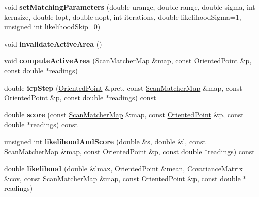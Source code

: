 \begin{DoxyCompactItemize}
void {\bfseries set\+Matching\+Parameters} (double urange, double range, double sigma, int kernsize, double lopt, double aopt, int iterations, double likelihood\+Sigma=1, unsigned int likelihood\+Skip=0)
\item 
\mbox{\label{classGMapping_1_1ScanMatcher_a60ef33bbb1408a534a74efccd096fc16}} 
void {\bfseries invalidate\+Active\+Area} ()
\item 
\mbox{\label{classGMapping_1_1ScanMatcher_a6cf280963c3d391f2cc8677f8e2e11cd}} 
void {\bfseries compute\+Active\+Area} (\hyperlink{classGMapping_1_1Map}{Scan\+Matcher\+Map} \&map, const \hyperlink{structGMapping_1_1orientedpoint}{Oriented\+Point} \&p, const double $\ast$readings)
\item 
\mbox{\label{classGMapping_1_1ScanMatcher_a676430fc7673dc7d9786a4a39e16f67d}} 
double {\bfseries icp\+Step} (\hyperlink{structGMapping_1_1orientedpoint}{Oriented\+Point} \&pret, const \hyperlink{classGMapping_1_1Map}{Scan\+Matcher\+Map} \&map, const \hyperlink{structGMapping_1_1orientedpoint}{Oriented\+Point} \&p, const double $\ast$readings) const
\item 
\mbox{\label{classGMapping_1_1ScanMatcher_a634d6d8fb5bbec96fe3b9bdd992b5565}} 
double {\bfseries score} (const \hyperlink{classGMapping_1_1Map}{Scan\+Matcher\+Map} \&map, const \hyperlink{structGMapping_1_1orientedpoint}{Oriented\+Point} \&p, const double $\ast$readings) const
\item 
\mbox{\label{classGMapping_1_1ScanMatcher_a619f90b0489e7a5858fa72d986680dc4}} 
unsigned int {\bfseries likelihood\+And\+Score} (double \&s, double \&l, const \hyperlink{classGMapping_1_1Map}{Scan\+Matcher\+Map} \&map, const \hyperlink{structGMapping_1_1orientedpoint}{Oriented\+Point} \&p, const double $\ast$readings) const
\item 
\mbox{\label{classGMapping_1_1ScanMatcher_a6c277f4226a7f217b7d9e1a39cd64205}} 
double {\bfseries likelihood} (double \&lmax, \hyperlink{structGMapping_1_1orientedpoint}{Oriented\+Point} \&mean, \hyperlink{structGMapping_1_1Covariance3}{Covariance\+Matrix} \&cov, const \hyperlink{classGMapping_1_1Map}{Scan\+Matcher\+Map} \&map, const \hyperlink{structGMapping_1_1orientedpoint}{Oriented\+Point} \&p, const double $\ast$readings)

\end{DoxyCompactItemize}
